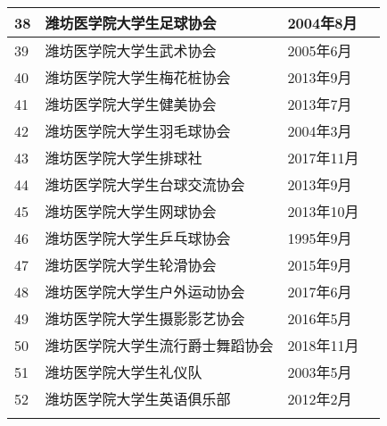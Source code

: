 \begin{table}[H]
\begin{tabular}{|>{\centering\arraybackslash}p{2em}|>{\centering\arraybackslash}p{21em}|%
        >{\centering\arraybackslash}p{6em}|>{\centering\arraybackslash}p{5em}|}
        \cline{1-3}
        38 & 潍坊医学院大学生足球协会     & 2004年8月  &                         \\
        \cline{1-3}
        39 & 潍坊医学院大学生武术协会     & 2005年6月  &                         \\
        \cline{1-3}
        40 & 潍坊医学院大学生梅花桩协会    & 2013年9月  &                         \\
        \cline{1-3}
        41 & 潍坊医学院大学生健美协会     & 2013年7月  &                         \\
        \cline{1-3}
        42 & 潍坊医学院大学生羽毛球协会    & 2004年3月  &                         \\
        \cline{1-3}
        43 & 潍坊医学院大学生排球社      & 2017年11月 &                         \\
        \cline{1-3}
        44 & 潍坊医学院大学生台球交流协会   & 2013年9月  &                         \\
        \cline{1-3}
        45 & 潍坊医学院大学生网球协会     & 2013年10月 &                         \\
        \cline{1-3}
        46 & 潍坊医学院大学生乒乓球协会    & 1995年9月  &                         \\
        \cline{1-3}
        47 & 潍坊医学院大学生轮滑协会     & 2015年9月  &                         \\
        \cline{1-3}
        48 & 潍坊医学院大学生户外运动协会   & 2017年6月  &                         \\
        \cline{1-3}
        49 & 潍坊医学院大学生摄影影艺协会   & 2016年5月  &                         \\
        \cline{1-3}
        50 & 潍坊医学院大学生流行爵士舞蹈协会 & 2018年11月 &                         \\
        \cline{1-3}
        51 & 潍坊医学院大学生礼仪队      & 2003年5月  &                         \\
        \cline{1-3}
        52 & 潍坊医学院大学生英语俱乐部    & 2012年2月  &                         \\
        \Xhline{1.2pt}
    \end{tabular}
\end{table}
